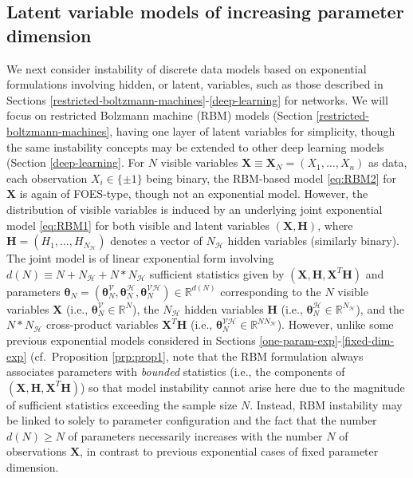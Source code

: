\documentclass[12pt]{article}
\theoremstyle{definition}
\begin{document}
\subsection{Latent variable models of increasing parameter
dimension}\label{latent-variable-models-of-increasing-parameter-dimension}

We next consider instability of discrete data models based on
exponential formulations involving hidden, or latent, variables, such as
those described in Sections
\ref{restricted-boltzmann-machines}-\ref{deep-learning} for networks. We
will focus on restricted Bolzmann machine (RBM) models (Section
\ref{restricted-boltzmann-machines}, having one layer of latent
variables for simplicity, though the same instability concepts may be
extended to other deep learning models (Section \ref{deep-learning}. For
\(N\) visible variables
\(\boldsymbol X \equiv \boldsymbol X_N = (X_1,\ldots,X_n)\) as data,
each observation \(X_i\in\{\pm 1\}\) being binary, the RBM-based model
\eqref{eq:RBM2} for \(\boldsymbol X\) is again of FOES-type, though not an
exponential model. However, the distribution of visible variables is
induced by an underlying joint exponential model \eqref{eq:RBM1} for both
visible and latent variables \((\boldsymbol X, \boldsymbol H)\), where
\(\boldsymbol H=(H_1,\ldots,H_{N_{\mathcal{H}}})\) denotes a vector of
\(N_{\mathcal{H}}\) hidden variables (similarly binary). The joint model
is of linear exponential form involving
\(d(N)\equiv N + N_{\mathcal{H}} + N* N_{\mathcal{H}}\) sufficient
statistics given by
\((\boldsymbol X, \boldsymbol H, \boldsymbol X^T\boldsymbol H)\) and
parameters
\(\boldsymbol \theta_N = (\boldsymbol \theta_N^{\mathcal{V}},\boldsymbol \theta_N^{\mathcal{H}}, \boldsymbol \theta_N^{\mathcal{VH}} ) \in\mathbb{R}^{d(N)}\)
corresponding to the \(N\) visible variables \(\boldsymbol X\) (i.e.,
\(\boldsymbol \theta_N^{\mathcal{V}}\in\mathbb{R}^N\)), the
\(N_{\mathcal{H}}\) hidden variables \(\boldsymbol H\) (i.e.,
\(\boldsymbol \theta_N^{\mathcal{H}}\in\mathbb{R}^{N_{\mathcal{H}}}\)),
and the \(N *N_{\mathcal{H}}\) cross-product variables
\(\boldsymbol X^T\boldsymbol H\) (i.e.,
\(\boldsymbol \theta_N^{\mathcal{VH}}\in\mathbb{R}^{N N_{\mathcal{H}}}\)).
However, unlike some previous exponential models considered in Sections
\ref{one-param-exp}-\ref{fixed-dim-exp} (cf.~Proposition
\ref{prp:prop1}, note that the RBM formulation always associates
parameters with \emph{bounded} statistics (i.e., the components of
\((\boldsymbol X, \boldsymbol H, \boldsymbol X^T\boldsymbol H)\)) so
that model instability cannot arise here due to the magnitude of
sufficient statistics exceeding the sample size \(N\). Instead, RBM
instability may be linked to solely to parameter configuration and the
fact that the number \(d(N) \geq N\) of parameters necessarily increases
with the number \(N\) of observations \(\boldsymbol X\), in contrast to
previous exponential cases of fixed parameter dimension.
\end{document}
